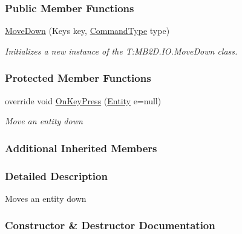 \subsubsection*{Public Member Functions}
\begin{DoxyCompactItemize}
\item 
\hyperlink{class_m_b2_d_1_1_i_o_1_1_move_down_ac486449a9efa2a903e55639592b25bf2}{Move\+Down} (Keys key, \hyperlink{namespace_m_b2_d_1_1_i_o_ab5f95f3fe9e652778b62bdf943168a68}{Command\+Type} type)
\begin{DoxyCompactList}\small\item\em Initializes a new instance of the T\+:\+M\+B2\+D.\+I\+O.\+Move\+Down class. \end{DoxyCompactList}\end{DoxyCompactItemize}
\subsubsection*{Protected Member Functions}
\begin{DoxyCompactItemize}
\item 
override void \hyperlink{class_m_b2_d_1_1_i_o_1_1_move_down_af93adf7def9f4869528ee2c86b474c19}{On\+Key\+Press} (\hyperlink{class_m_b2_d_1_1_entity_component_1_1_entity}{Entity} e=null)
\begin{DoxyCompactList}\small\item\em Move an entity down \end{DoxyCompactList}\end{DoxyCompactItemize}
\subsubsection*{Additional Inherited Members}


\subsubsection{Detailed Description}
Moves an entity down 



\subsubsection{Constructor \& Destructor Documentation}
\hypertarget{class_m_b2_d_1_1_i_o_1_1_move_down_ac486449a9efa2a903e55639592b25bf2}{}\label{class_m_b2_d_1_1_i_o_1_1_move_down_ac486449a9efa2a903e55639592b25bf2} 
